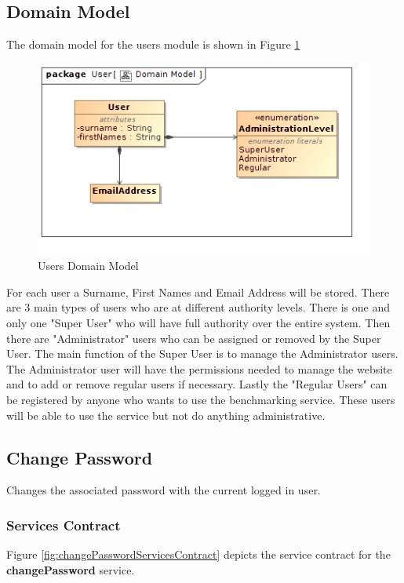 \subsection{Domain Model}
The domain model for the users module is shown in Figure \ref{Users Domain Model}
\begin{figure}[H]
  \begin{center}
  \includegraphics[scale=1.0]{../Diagrams and Charts/Users/Domain Model.jpg}
  \caption{Users Domain Model}
  \end{center}
  \label{Users Domain Model}
\end{figure}
For each user a Surname, First Names and Email Address will be stored.
There are 3 main types of users who
are at different authority levels. There is one and only one "Super User" who
will have full authority over the entire system. Then there are "Administrator"
users who can be assigned or removed by the Super User. The main function of
the Super User is to manage the Administrator users. The Administrator user
will have the permissions needed to manage the website and to add or remove
regular users if necessary. Lastly the "Regular Users"
can be registered by anyone who wants to use the benchmarking service. These users
will be able to use the service but not do anything administrative.

\subsection{Change Password}
Changes the associated password with the current logged in user.

\subsubsection{Services Contract}
Figure \ref{fig:changePasswordServicesContract} depicts the service contract for the \textbf{changePassword} service.

